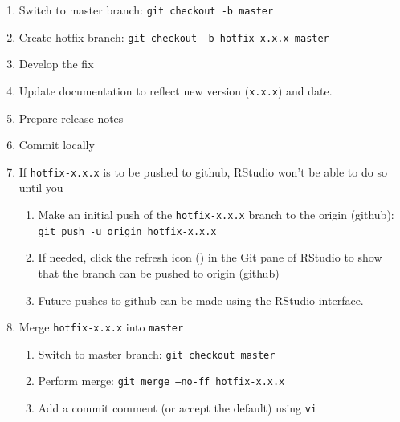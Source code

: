 \documentclass{article}
\begin{document}
\begin{enumerate}

  \item Switch to master branch: \texttt{git checkout -b master} 

  \item Create hotfix branch: \texttt{git checkout -b hotfix-x.x.x master} 
	
  \item Develop the fix
	
  \item Update documentation to reflect new version (\texttt{x.x.x}) and date.
  
  \item Prepare release notes
  
  \item Commit locally
	
  \item If \texttt{hotfix-x.x.x} is to be pushed to github, RStudio won't be able to do so until you
  \begin{enumerate}

    \item Make an initial push of the \texttt{hotfix-x.x.x} branch
  	      to the origin (github):
  		  \texttt{git push -u origin hotfix-x.x.x} 
		  
	\item If needed, click the refresh icon 
  		  () in the Git pane of RStudio to 
  		  show that the branch can be pushed to origin (github)

  	\item Future pushes to github can be made using the RStudio interface.

  \end{enumerate}
  \item Merge \texttt{hotfix-x.x.x} into \texttt{master}  
  \begin{enumerate}

    \item Switch to master branch: \texttt{git checkout master} 
	
    \item Perform merge: \texttt{git merge --no-ff hotfix-x.x.x} 
	
	\item Add a commit comment (or accept the default) using \texttt{vi} 
	

\end{enumerate}
\end{enumerate}
\end{document}
